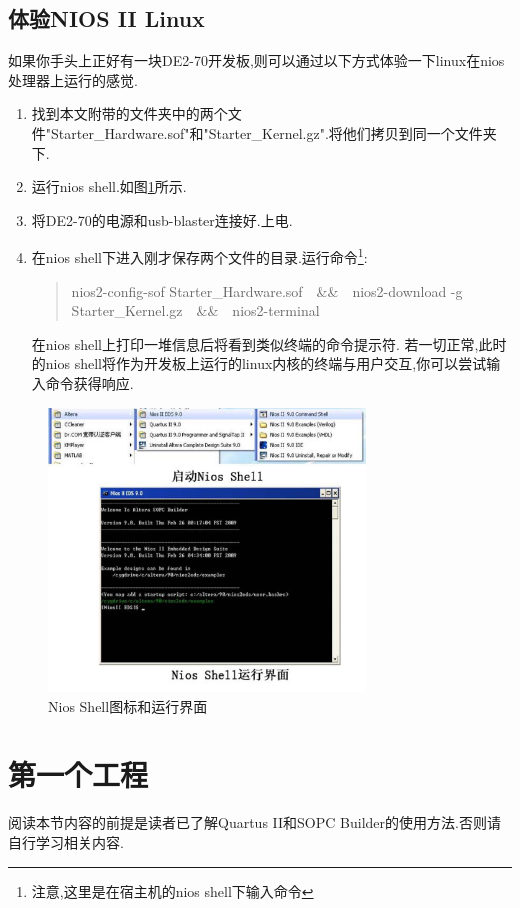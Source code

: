 \documentclass[12pt,a4paper,titlepage]{article}
\begin{document}
\subsection{体验NIOS II Linux}
如果你手头上正好有一块DE2-70开发板,则可以通过以下方式体验一下linux在nios处理器上运行的感觉.
\begin{enumerate}
\item 找到本文附带的文件夹中的两个文件"Starter\_Hardware.sof"和"Starter\_Kernel.gz".将他们拷贝到同一个文件夹下.
\item 运行nios shell.如图\ref{ns}所示.
\item 将DE2-70的电源和usb-blaster连接好.上电.
\item 在nios shell下进入刚才保存两个文件的目录.{运行命令}\footnote{注意,这里是在宿主机的nios shell下输入命令}:
\begin{verse}
nios2-config-sof Starter\_Hardware.sof\ {}\ {}\&\&\ {}\ {}nios2-download -g Starter\_Kernel.gz\ {}\ {}\&\&\ {}\ {}nios2-terminal
\end{verse}
在nios shell上打印一堆信息后将看到类似终端的命令提示符.
若一切正常,此时的nios shell将作为开发板上运行的linux内核的终端与用户交互,你可以尝试输入命令获得响应.
\end{enumerate}
\begin{figure}[!htbp]
\centering
\includegraphics[width=0.75\textwidth,scale=0.75]{pic/f_shell_and_icon.eps}
\caption{Nios Shell图标和运行界面\label{ns}}
\end{figure}
\newpage{}
\section{第一个工程}
\setcounter{footnote}{0}
阅读本节内容的前提是读者已了解Quartus II和SOPC Builder的使用方法.否则请自行学习相关内容.
\end{document}

